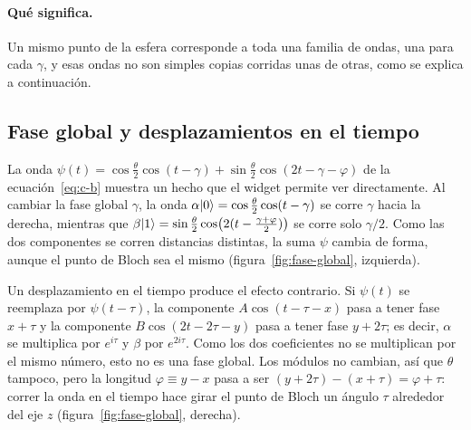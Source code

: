 \paragraph{Qué significa.}
Un mismo punto de la esfera corresponde a toda una familia de ondas, una para cada $\gamma$, y
esas ondas no son simples copias corridas unas de otras, como se explica a continuación.

\subsection*{Fase global y desplazamientos en el tiempo}

La onda $\psi(t)=\cos\frac\theta2\cos(t-\gamma)+\sin\frac\theta2\cos(2t-\gamma-\varphi)$ de la
ecuación~\eqref{eq:c-b} muestra un hecho que el widget permite ver directamente. Al cambiar la
fase global $\gamma$, la onda $\alpha\lvert 0\rangle=\cos\frac\theta2\cos(t-\gamma)$ se corre $\gamma$
hacia la derecha, mientras que
$\beta\lvert 1\rangle=\sin\frac\theta2\cos\bigl(2(t-\frac{\gamma+\varphi}2)\bigr)$ se corre solo
$\gamma/2$. Como las dos componentes se corren distancias distintas, la suma $\psi$ cambia de
forma, aunque el punto de Bloch sea el mismo (figura~\ref{fig:fase-global}, izquierda).

Un desplazamiento en el tiempo produce el efecto contrario. Si $\psi(t)$ se reemplaza por
$\psi(t-\tau)$, la componente $A\cos(t-\tau-x)$ pasa a tener fase $x+\tau$ y la componente
$B\cos(2t-2\tau-y)$ pasa a tener fase $y+2\tau$; es decir, $\alpha$ se multiplica por
$e^{i\tau}$ y $\beta$ por $e^{2i\tau}$. Como los dos coeficientes no se multiplican por el mismo
número, esto no es una fase global. Los módulos no cambian, así que $\theta$ tampoco, pero la
longitud $\varphi\equiv y-x$ pasa a ser $(y+2\tau)-(x+\tau)=\varphi+\tau$: correr la onda en el
tiempo hace girar el punto de Bloch un ángulo $\tau$ alrededor del eje $z$
(figura~\ref{fig:fase-global}, derecha).

